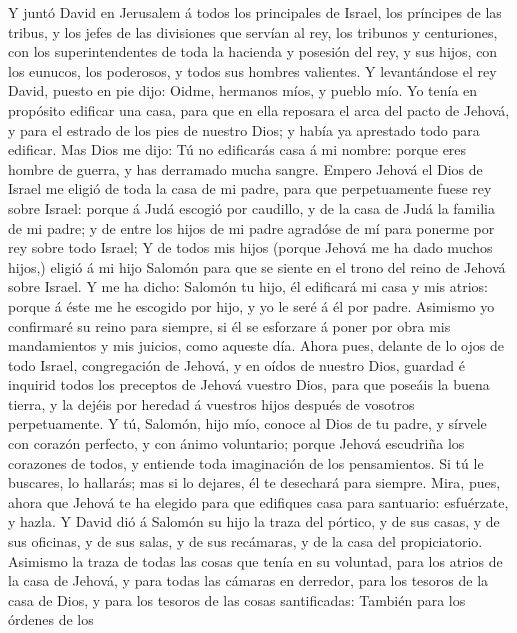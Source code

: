  Y juntó David en Jerusalem á todos los principales de
Israel, los príncipes de las tribus, y los jefes de las divisiones que
servían al rey, los tribunos y centuriones, con los superintendentes de
toda la hacienda y posesión del rey, y sus hijos, con los eunucos, los
poderosos, y todos sus hombres valientes.  Y levantándose
el rey David, puesto en pie dijo: Oidme, hermanos míos, y pueblo mío. Yo
tenía en propósito edificar una casa, para que en ella reposara el arca
del pacto de Jehová, y para el estrado de los pies de nuestro Dios; y
había ya aprestado todo para edificar.  Mas Dios me dijo:
Tú no edificarás casa á mi nombre: porque eres hombre de guerra, y has
derramado mucha sangre.  Empero Jehová el Dios de Israel
me eligió de toda la casa de mi padre, para que perpetuamente fuese rey
sobre Israel: porque á Judá escogió por caudillo, y de la casa de Judá
la familia de mi padre; y de entre los hijos de mi padre agradóse de mí
para ponerme por rey sobre todo Israel;  Y de todos mis
hijos (porque Jehová me ha dado muchos hijos,) eligió á mi hijo Salomón
para que se siente en el trono del reino de Jehová sobre Israel.
 Y me ha dicho: Salomón tu hijo, él edificará mi casa y
mis atrios: porque á éste me he escogido por hijo, y yo le seré á él por
padre.  Asimismo yo confirmaré su reino para siempre, si
él se esforzare á poner por obra mis mandamientos y mis juicios, como
aqueste día.  Ahora pues, delante de lo ojos de todo
Israel, congregación de Jehová, y en oídos de nuestro Dios, guardad é
inquirid todos los preceptos de Jehová vuestro Dios, para que poseáis la
buena tierra, y la dejéis por heredad á vuestros hijos después de
vosotros perpetuamente.  Y tú, Salomón, hijo mío, conoce
al Dios de tu padre, y sírvele con corazón perfecto, y con ánimo
voluntario; porque Jehová escudriña los corazones de todos, y entiende
toda imaginación de los pensamientos. Si tú le buscares, lo hallarás;
mas si lo dejares, él te desechará para siempre.  Mira,
pues, ahora que Jehová te ha elegido para que edifiques casa para
santuario: esfuérzate, y hazla.  Y David dió á Salomón su
hijo la traza del pórtico, y de sus casas, y de sus oficinas, y de sus
salas, y de sus recámaras, y de la casa del propiciatorio.
 Asimismo la traza de todas las cosas que tenía en su
voluntad, para los atrios de la casa de Jehová, y para todas las cámaras
en derredor, para los tesoros de la casa de Dios, y para los tesoros de
las cosas santificadas:  También para los órdenes de los
